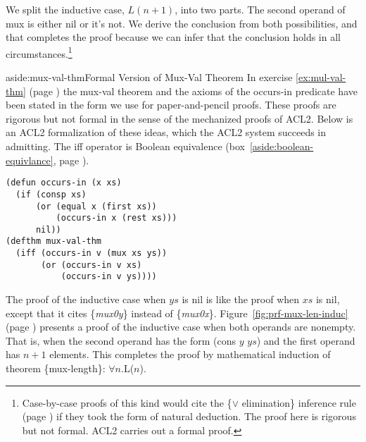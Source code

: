 We split the inductive case, $L(n+1)$, into two parts.
The second operand of \textsf{mux} is either \textsf{nil} or it's not. %
We derive the conclusion from both possibilities,
and that completes the proof because we can infer
that the conclusion holds in all
circumstances.\footnote{Case-by-case proofs of this kind
would cite the \{$\vee$ elimination\} inference rule
(page \pageref{fig-02-deduction-rules}) if they
took the form of natural deduction.
The proof here is rigorous but not formal.
ACL2 carries out a formal proof.}

\begin{aside}{aside:mux-val-thm}{Formal Version of Mux-Val Theorem}
In exercise \ref{ex:mul-val-thm} (page \pageref{ex:mul-val-thm})
the mux-val theorem
and the axioms of the \textsf{occurs-in} predicate
have been stated in the form we use for paper-and-pencil proofs.
These proofs are rigorous but not formal
in the sense of the mechanized proofs of ACL2.
Below is an ACL2 formalization of these ideas,
which the ACL2 system succeeds in admitting.
\label{acl2:iff}
The
\textsf{iff}
operator is Boolean equivalence
(box~\ref{aside:boolean-equivlance}, page \pageref{aside:boolean-equivlance}).

\label{defun:occurs-in}
\begin{code}
\begin{verbatim}
(defun occurs-in (x xs)
  (if (consp xs)
      (or (equal x (first xs))
          (occurs-in x (rest xs)))
      nil))
(defthm mux-val-thm
  (iff (occurs-in v (mux xs ys))
       (or (occurs-in v xs)
           (occurs-in v ys))))
\end{verbatim}
\end{code}
\end{aside}

The proof of the inductive case when $ys$ is \textsf{nil}
is like the proof when $xs$ is \textsf{nil},
except that it cites \{\emph{mux0y}\} instead of \{\emph{mux0x}\}.
Figure~\ref{fig:prf-mux-len-induc} (page \pageref{fig:prf-mux-len-induc})
presents a proof  of the inductive case when both operands are nonempty.
That is, when the second operand has the form \textsf{(cons $y$ $ys$)}
and the first operand has $n+1$ elements.
This completes the proof by mathematical induction of
theorem \{mux-length\}: $\forall n.$L($n$).

